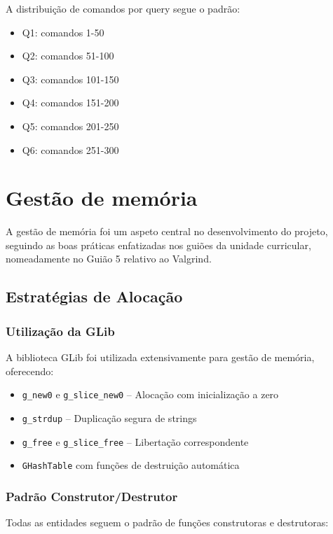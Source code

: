 \documentclass[a4paper,12pt]{scrreprt}
\begin{document}
A distribuição de comandos por query segue o padrão:
\begin{itemize}
    \item Q1: comandos 1-50
    \item Q2: comandos 51-100
    \item Q3: comandos 101-150
    \item Q4: comandos 151-200
    \item Q5: comandos 201-250
    \item Q6: comandos 251-300
\end{itemize}


\chapter{Gestão de memória}

A gestão de memória foi um aspeto central no desenvolvimento do projeto, seguindo as boas práticas enfatizadas nos guiões da unidade curricular, nomeadamente no Guião 5 relativo ao Valgrind.

\section{Estratégias de Alocação}

\subsection{Utilização da GLib}

A biblioteca GLib foi utilizada extensivamente para gestão de memória, oferecendo:

\begin{itemize}
    \item \texttt{g\_new0} e \texttt{g\_slice\_new0} -- Alocação com inicialização a zero
    \item \texttt{g\_strdup} -- Duplicação segura de strings
    \item \texttt{g\_free} e \texttt{g\_slice\_free} -- Libertação correspondente
    \item \texttt{GHashTable} com funções de destruição automática
\end{itemize}

\subsection{Padrão Construtor/Destrutor}

Todas as entidades seguem o padrão de funções construtoras e destrutoras:
\end{document}
